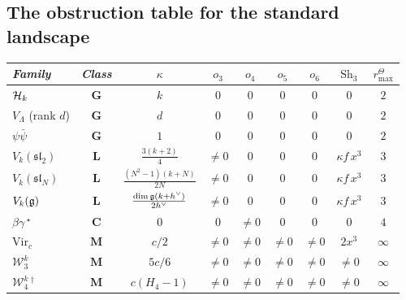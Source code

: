 
\subsection{The obstruction table for the standard landscape}

\begin{theorem}
\ClaimStatusProvedHere
{}
\begin{center}
\footnotesize
\renewcommand{\arraystretch}{1.4}
\begin{tabular}{l@{\;\;}c@{\;\;}c@{\;\;}c@{\;\;}c@{\;\;}c@{\;\;}c@{\;\;}c@{\;\;}c}
\toprule
\emph{Family} & \emph{Class} & $\kappa$ &
 $o_3$ & $o_4$ & $o_5$ & $o_6$ &
 $\mathrm{Sh}_3$ & \(r^\Theta_{\max}\) \\
\midrule
$\mathcal{H}_k$ &
 $\mathbf{G}$ & $k$ &
 $0$ & $0$ & $0$ & $0$ & $0$ & $2$ \\
$V_\Lambda$ (rank $d$) &
 $\mathbf{G}$ & $d$ &
 $0$ & $0$ & $0$ & $0$ & $0$ & $2$ \\
$\psi\bar\psi$ &
 $\mathbf{G}$ & $1$ &
 $0$ & $0$ & $0$ & $0$ & $0$ & $2$ \\[2pt]
$V_k(\mathfrak{sl}_2)$ &
 $\mathbf{L}$ & $\frac{3(k+2)}{4}$ &
 $\neq 0$ & $0$ & $0$ & $0$ &
 $\kappa f\,x^3$ & $3$ \\
$V_k(\mathfrak{sl}_N)$ &
 $\mathbf{L}$ & $\frac{(N^2{-}1)(k+N)}{2N}$ &
 $\neq 0$ & $0$ & $0$ & $0$ &
 $\kappa f\,x^3$ & $3$ \\
$V_k(\mathfrak{g})$ &
 $\mathbf{L}$ & $\frac{\dim\mathfrak{g}(k+h^\vee)}{2h^\vee}$ &
 $\neq 0$ & $0$ & $0$ & $0$ &
 $\kappa f\,x^3$ & $3$ \\[2pt]
$\beta\gamma$\,$^\star$ &
 $\mathbf{C}$ & $0$ &
 $0$ & $\neq 0$ & $0$ & $0$ &
 $0$ & $4$ \\[2pt]
$\mathrm{Vir}_c$ &
 $\mathbf{M}$ & $c/2$ &
 $\neq 0$ & $\neq 0$ & $\neq 0$ & $\neq 0$ &
 $2x^3$ & $\infty$ \\
$\mathcal{W}_3^k$ &
 $\mathbf{M}$ & $5c/6$ &
 $\neq 0$ & $\neq 0$ & $\neq 0$ & $\neq 0$ &
 $\neq 0$ & $\infty$ \\
$\mathcal{W}_4^k$\,$^\dagger$ &
 $\mathbf{M}$ & $c(H_4{-}1)$ &
 $\neq 0$ & $\neq 0$ & $\neq 0$ & $\neq 0$ &
 $\neq 0$ & $\infty$ \\

\end{tabular}
\end{center}
\end{theorem}
